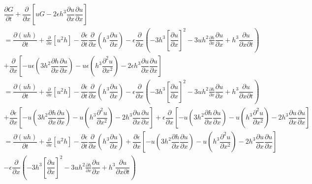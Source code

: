 \documentclass[10pt]{article}
\begin{document}
\begin{multline}
\dfrac{\partial G}{\partial t} + \dfrac{\partial}{\partial x} \left[uG -2\epsilon h^3 \dfrac{\partial u}{\partial x} \dfrac{\partial u}{\partial x}\right] \\ = \dfrac{\partial (uh)}{\partial t} + \frac{\partial}{\partial x}\left[u^2h\right] -\dfrac{\partial \epsilon}{\partial t}\dfrac{\partial }{\partial x} \left (h^3 \dfrac{\partial u}{\partial x} \right ) - \epsilon\dfrac{\partial }{ \partial x} \left (-3h^3 \left[\dfrac{\partial u}{\partial x}\right]^2 -3uh^2 \frac{\partial h}{\partial x}\dfrac{\partial u}{\partial x} + h^3 \dfrac{\partial u}{\partial x \partial t} \right ) \\+\dfrac{\partial}{\partial x} \left[ - u\epsilon\left (3h^2 \dfrac{\partial h}{\partial x} \dfrac{\partial u}{\partial x} \right ) - u\epsilon \left(h^3 \dfrac{\partial^2 u}{\partial x^2} \right) -2\epsilon h^3 \dfrac{\partial u}{\partial x} \dfrac{\partial u}{\partial x} \right] \\ = \dfrac{\partial (uh)}{\partial t} + \frac{\partial}{\partial x}\left[u^2h\right] -\dfrac{\partial \epsilon}{\partial t}\dfrac{\partial }{\partial x} \left (h^3 \dfrac{\partial u}{\partial x} \right ) - \epsilon\dfrac{\partial }{ \partial x} \left (-3h^3 \left[\dfrac{\partial u}{\partial x}\right]^2 -3uh^2 \frac{\partial h}{\partial x}\dfrac{\partial u}{\partial x} + h^3 \dfrac{\partial u}{\partial x \partial t} \right ) \\+\dfrac{\partial\epsilon}{\partial x} \left[ - u\left (3h^2 \dfrac{\partial h}{\partial x} \dfrac{\partial u}{\partial x} \right ) - u \left(h^3 \dfrac{\partial^2 u}{\partial x^2} \right) -2 h^3 \dfrac{\partial u}{\partial x} \dfrac{\partial u}{\partial x} \right] 
+\epsilon \dfrac{\partial}{\partial x} \left[ - u\left (3h^2 \dfrac{\partial h}{\partial x} \dfrac{\partial u}{\partial x} \right ) - u \left(h^3 \dfrac{\partial^2 u}{\partial x^2} \right) -2 h^3 \dfrac{\partial u}{\partial x} \dfrac{\partial u}{\partial x} \right] 
\\ = \dfrac{\partial (uh)}{\partial t} + \frac{\partial}{\partial x}\left[u^2h\right] -\dfrac{\partial \epsilon}{\partial t}\dfrac{\partial }{\partial x} \left (h^3 \dfrac{\partial u}{\partial x} \right ) +\dfrac{\partial\epsilon}{\partial x} \left[ - u\left (3h^2 \dfrac{\partial h}{\partial x} \dfrac{\partial u}{\partial x} \right ) - u \left(h^3 \dfrac{\partial^2 u}{\partial x^2} \right) -2 h^3 \dfrac{\partial u}{\partial x} \dfrac{\partial u}{\partial x} \right] \\ - \epsilon\dfrac{\partial }{ \partial x} \left (-3h^3 \left[\dfrac{\partial u}{\partial x}\right]^2 -3uh^2 \frac{\partial h}{\partial x}\dfrac{\partial u}{\partial x} + h^3 \dfrac{\partial u}{\partial x \partial t} \right )

\end{multline}
\end{document}
